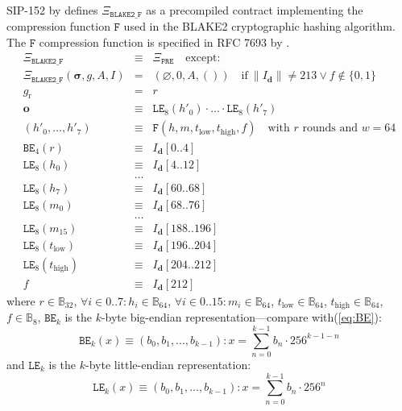 \documentclass[9pt,oneside]{amsart}
\begin{document}
SIP-152 by \cite{SIP-152} defines $\Xi_{\mathtt{BLAKE2\_F}}$ as a precompiled contract implementing the compression function $\mathtt{F}$ used in the BLAKE2 cryptographic hashing algorithm.
The $\mathtt{F}$ compression function is specified in RFC 7693 by \cite{RFC-7693}.
\begin{eqnarray}
  \Xi_{\mathtt{BLAKE2\_F}}&\equiv&\Xi_{\mathtt{PRE}}\quad\text{except:}\\
  \Xi_{\mathtt{BLAKE2\_F}}(\boldsymbol\sigma,g,A,I)&=&\left(\varnothing,0,A,()\right)\quad\text{if}\ \lVert I_{\mathbf{d}}\rVert \neq 213 \vee f \notin \{0, 1\} \\
  g_{\mathrm{r}} &=& r\\
  \mathbf{o} &\equiv& \mathtt{LE}_8(h'_0)\cdot ... \cdot \mathtt{LE}_8(h'_7) \\
  (h'_0,\dots,h'_7) &\equiv& \mathtt{F}(h, m, t_\mathrm{low}, t_\mathrm{high}, f) \quad\text{with } r \text{ rounds and } w = 64 \\
  \mathtt{BE}_4(r) &\equiv& I_{\mathbf{d}}[0..4] \\
  \mathtt{LE}_8(h_0) &\equiv& I_{\mathbf{d}}[4..12] \\
  &\dots& \\
  \mathtt{LE}_8(h_7) &\equiv& I_{\mathbf{d}}[60..68] \\
  \mathtt{LE}_8(m_0) &\equiv& I_{\mathbf{d}}[68..76] \\
  &\dots& \\
  \mathtt{LE}_8(m_{15}) &\equiv& I_{\mathbf{d}}[188..196] \\
  \mathtt{LE}_8(t_\mathrm{low}) &\equiv& I_{\mathbf{d}}[196..204] \\
  \mathtt{LE}_8(t_\mathrm{high}) &\equiv& I_{\mathbf{d}}[204..212] \\
  f &\equiv& I_{\mathbf{d}}[212]
\end{eqnarray}
where $r \in \mathbb{B}_{32}$, $\forall i \in 0..7: h_i \in \mathbb{B}_{64}$, $\forall i \in 0..15: m_i \in \mathbb{B}_{64}$,
$t_\mathrm{low} \in \mathbb{B}_{64}$, $t_\mathrm{high} \in \mathbb{B}_{64}$, $f \in \mathbb{B}_8$,
$\mathtt{BE}_k$ is the $k$-byte big-endian representation---compare with(\ref{eq:BE}):
\begin{equation}
  \mathtt{BE}_k(x) \equiv (b_0, b_1, ..., b_{k-1}): x = \sum_{n = 0}^{k-1} b_n \cdot 256^{k-1-n}
\end{equation}
and $\mathtt{LE}_k$ is the $k$-byte little-endian representation:
\begin{equation}
  \mathtt{LE}_k(x) \equiv (b_0, b_1, ..., b_{k-1}): x = \sum_{n = 0}^{k-1} b_n \cdot 256^n
\end{equation}
\end{document}
